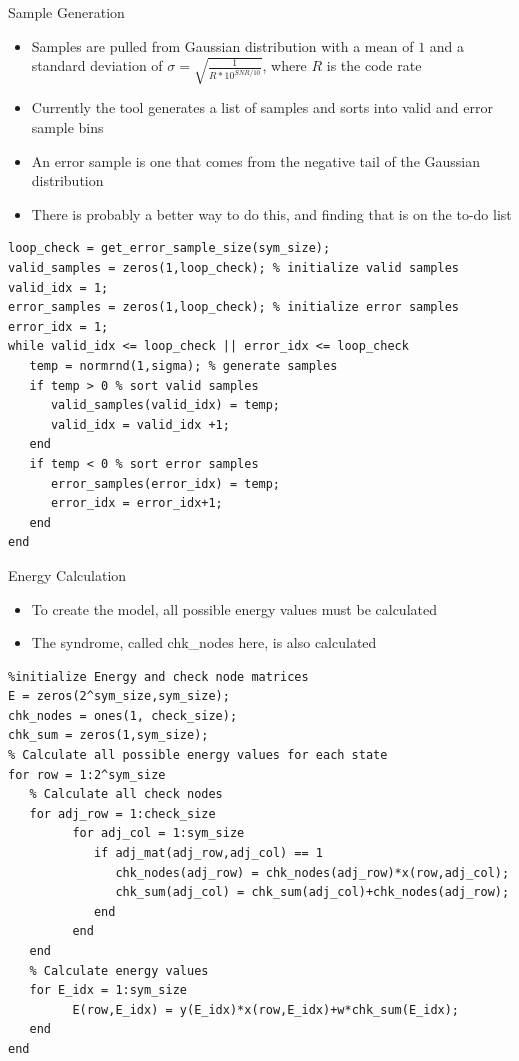 \documentclass[10pt,ignorenonframetext,]{beamer}
\providecommand{\tightlist}{%
  \setlength{\itemsep}{0pt}\setlength{\parskip}{0pt}}
\begin{document}
\begin{frame}[fragile]{Sample Generation}
\protect\hypertarget{sample-generation}{}
\begin{itemize}[<+->]
\tightlist
\item
  Samples are pulled from Gaussian distribution with a mean of \(1\) and
  a standard deviation of \(\sigma=\sqrt{\frac{1}{R*10^{SNR/10}}}\),
  where \(R\) is the code rate
\item
  Currently the tool generates a list of samples and sorts into valid
  and error sample bins
\item
  An error sample is one that comes from the negative tail of the
  Gaussian distribution
\item
  There is probably a better way to do this, and finding that is on the
  to-do list
\end{itemize}

\begin{verbatim}
loop_check = get_error_sample_size(sym_size);
valid_samples = zeros(1,loop_check); % initialize valid samples
valid_idx = 1;
error_samples = zeros(1,loop_check); % initialize error samples
error_idx = 1;
while valid_idx <= loop_check || error_idx <= loop_check 
   temp = normrnd(1,sigma); % generate samples
   if temp > 0 % sort valid samples
      valid_samples(valid_idx) = temp;
      valid_idx = valid_idx +1;
   end
   if temp < 0 % sort error samples
      error_samples(error_idx) = temp;
      error_idx = error_idx+1;
   end
end
\end{verbatim}
\end{frame}

\begin{frame}[fragile]{Energy Calculation}
\protect\hypertarget{energy-calculation}{}
\begin{itemize}[<+->]
\tightlist
\item
  To create the model, all possible energy values must be calculated
\item
  The syndrome, called chk\_nodes here, is also calculated
\end{itemize}

\begin{verbatim}
%initialize Energy and check node matrices
E = zeros(2^sym_size,sym_size);
chk_nodes = ones(1, check_size);
chk_sum = zeros(1,sym_size);
% Calculate all possible energy values for each state
for row = 1:2^sym_size
   % Calculate all check nodes
   for adj_row = 1:check_size
         for adj_col = 1:sym_size
            if adj_mat(adj_row,adj_col) == 1
               chk_nodes(adj_row) = chk_nodes(adj_row)*x(row,adj_col);
               chk_sum(adj_col) = chk_sum(adj_col)+chk_nodes(adj_row);
            end
         end
   end
   % Calculate energy values
   for E_idx = 1:sym_size
         E(row,E_idx) = y(E_idx)*x(row,E_idx)+w*chk_sum(E_idx);
   end
end
\end{verbatim}
\end{frame}
\end{document}
